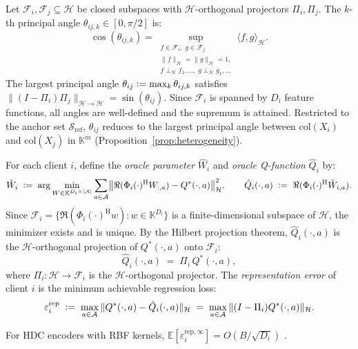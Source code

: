 \begin{definition}
\label{def:principal_angle}
Let $\mathcal{F}_i,\mathcal{F}_j\subseteq\mathcal{H}$ be closed
subspaces with $\mathcal{H}$-orthogonal projectors
$\Pi_i,\Pi_j$.
The $k$-th principal angle
$\theta_{ij,k}\in[0,\pi/2]$ is:
\begin{equation}
    \cos(\theta_{ij,k})
    =
    \sup_{\substack{f\in\mathcal{F}_i,\;g\in\mathcal{F}_j\\
    \|f\|_{\mathcal{H}}=\|g\|_{\mathcal{H}}=1,\\
    f\perp_{\mathcal{H}} f_1,\ldots,\;
    g\perp_{\mathcal{H}} g_1,\ldots}}
    \langle f,g\rangle_{\mathcal{H}}.
\end{equation}
The largest principal angle
$\theta_{ij}\vcentcolon=\max_k\theta_{ij,k}$ satisfies
$\|(I-\Pi_i)\Pi_j\|_{\mathcal{H}\to\mathcal{H}}
=\sin(\theta_{ij})$.
Since $\mathcal{F}_i$ is spanned by $D_i$ feature functions,
all angles are well-defined and the supremum is attained.
Restricted to the anchor set $\mathcal{S}_{\mathrm{ref}}$,
$\theta_{ij}$ reduces to the largest principal angle between
$\mathrm{col}(X_i)$ and $\mathrm{col}(X_j)$ in
$\mathbb{K}^m$ (Proposition~\ref{prop:heterogeneity}).
\end{definition}

\begin{definition}
\label{def:oracle}
For each client $i$, define the \emph{oracle parameter}
$\hat{W}_i$ and \emph{oracle Q-function} $\hat{Q}_i$ by:
\begin{equation}
    \hat{W}_i
    \;\vcentcolon=\;
    \arg\min_{W\in\mathbb{K}^{D_i\times|\mathcal{A}|}}
    \sum_{a\in\mathcal{A}}
    \bigl\|
    \Re(\Phi_i(\cdot)^{\mathrm{H}}W_{:,a})
    - Q^*(\cdot,a)
    \bigr\|_{\mathcal{H}}^2,
    \qquad
    \hat{Q}_i(\cdot,a)
    \;\vcentcolon=\;
    \Re(\Phi_i(\cdot)^{\mathrm{H}}\hat{W}_{i,a}).
    \label{eq:oracle_def}
\end{equation}
Since $\mathcal{F}_i
=\{\Re(\Phi_i(\cdot)^{\mathrm{H}}w):w\in\mathbb{K}^{D_i}\}$
is a finite-dimensional subspace of
$\mathcal{H}$, the minimizer exists and is unique.
By the Hilbert projection theorem, $\hat{Q}_i(\cdot,a)$ is
the $\mathcal{H}$-orthogonal projection of $Q^*(\cdot,a)$
onto $\mathcal{F}_i$:
\begin{equation}
    \hat{Q}_i(\cdot,a)
    \;=\;
    \Pi_i\,Q^*(\cdot,a),
    \label{eq:oracle_is_proj}
\end{equation}
where $\Pi_i:\mathcal{H}\to\mathcal{F}_i$ is the
$\mathcal{H}$-orthogonal projector.
The \emph{representation error} of client $i$ is the
minimum achievable regression loss:
\begin{equation}
    \varepsilon_i^{\mathrm{rep}}
    \;\vcentcolon=\;
    \max_{a\in\mathcal{A}}
    \|Q^*(\cdot,a)-\hat{Q}_i(\cdot,a)\|_{\mathcal{H}}
    \;=\;
    \max_{a\in\mathcal{A}}
    \|(I-\Pi_i)Q^*(\cdot,a)\|_{\mathcal{H}}.
    \label{eq:rep_error}
\end{equation}

For HDC encoders with RBF kernels,
$\mathbb{E}[\varepsilon_i^{\mathrm{rep},\infty}]
=O(B/\sqrt{D_i})$ \citep{rudi2017generalization}.
\end{definition}






